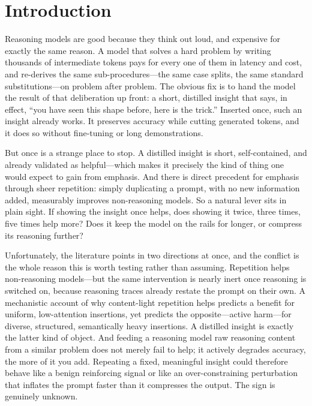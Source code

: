 \section{Introduction}
Reasoning models are good because they think out loud, and expensive for exactly
the same reason. A model that solves a hard problem by writing thousands of
intermediate tokens pays for every one of them in latency and cost, and re-derives
the same sub-procedures---the same case splits, the same standard substitutions---on
problem after problem. The obvious fix is to hand the model the result of that
deliberation up front: a short, distilled insight that says, in effect, ``you have
seen this shape before, here is the trick.'' Inserted once, such an insight already
works. It preserves accuracy while cutting generated tokens, and it does so without
fine-tuning or long demonstrations.

But once is a strange place to stop. A distilled insight is short, self-contained,
and already validated as helpful---which makes it precisely the kind of thing one
would expect to gain from emphasis. And there is direct precedent for emphasis
through sheer repetition: simply duplicating a prompt, with no new information added,
measurably improves non-reasoning models. So a natural lever sits in plain sight. If
showing the insight once helps, does showing it twice, three times, five times help
more? Does it keep the model on the rails for longer, or compress its reasoning
further?

Unfortunately, the literature points in two directions at once, and the conflict is
the whole reason this is worth testing rather than assuming. Repetition helps
non-reasoning models---but the same intervention is nearly inert once reasoning is
switched on, because reasoning traces already restate the prompt on their own. A
mechanistic account of why content-light repetition helps predicts a benefit for
uniform, low-attention insertions, yet predicts the opposite---active
harm---for diverse, structured, semantically heavy insertions. A distilled insight is
exactly the latter kind of object. And feeding a reasoning model raw reasoning
content from a similar problem does not merely fail to help; it actively degrades
accuracy, the more of it you add. Repeating a fixed, meaningful insight could
therefore behave like a benign reinforcing signal or like an over-constraining
perturbation that inflates the prompt faster than it compresses the output. The sign
is genuinely unknown.



